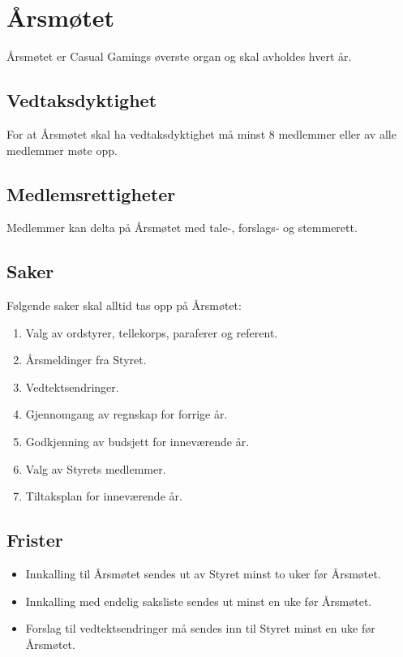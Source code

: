 \chapter{Årsmøtet}
Årsmøtet er Casual Gamings øverste organ og skal avholdes hvert år.

\section{Vedtaksdyktighet}
For at Årsmøtet skal ha vedtaksdyktighet må minst 8 medlemmer eller  av alle medlemmer møte opp.

\section{Medlemsrettigheter}
Medlemmer kan delta på Årsmøtet med tale-, forslags‐ og stemmerett.

\section{Saker}
Følgende saker skal alltid tas opp på Årsmøtet:
\begin{enumerate}
    \item Valg av ordstyrer, tellekorps, paraferer og referent.
    \item Årsmeldinger fra Styret.
    \item Vedtektsendringer.
    \item Gjennomgang av regnskap for forrige år.
    \item Godkjenning av budsjett for inneværende år.
    \item Valg av Styrets medlemmer.
    \item Tiltaksplan for inneværende år.
\end{enumerate}

\section{Frister}
\begin{itemize}
    \item Innkalling til Årsmøtet sendes ut av Styret minst to uker før Årsmøtet.
    \item Innkalling med endelig saksliste sendes ut minst en uke før Årsmøtet.
    \item Forslag til vedtektsendringer må sendes inn til Styret minst en uke før Årsmøtet.
\end{itemize}

